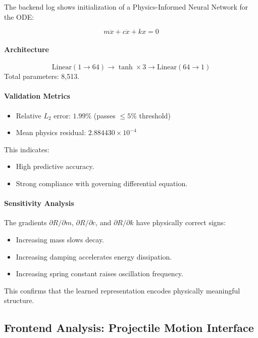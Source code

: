 \documentclass[12pt,singleside,a4paper]{article}
\begin{document}
The backend log shows initialization of a Physics-Informed Neural Network for the ODE:

\[
m\ddot{x} + c\dot{x} + kx = 0
\]

\paragraph{Architecture}
\[
\text{Linear}(1 \rightarrow 64) \rightarrow \tanh \times 3 \rightarrow \text{Linear}(64 \rightarrow 1)
\]
Total parameters: 8,513.

\paragraph{Validation Metrics}
\begin{itemize}
    \item Relative $L_2$ error: $1.99\%$ (passes $\leq 5\%$ threshold)
    \item Mean physics residual: $2.884430 \times 10^{-4}$
\end{itemize}

This indicates:
\begin{itemize}
    \item High predictive accuracy.
    \item Strong compliance with governing differential equation.
\end{itemize}

\paragraph{Sensitivity Analysis}

The gradients $\partial R/\partial m$, $\partial R/\partial c$, and $\partial R/\partial k$ have physically correct signs:

\begin{itemize}
    \item Increasing mass slows decay.
    \item Increasing damping accelerates energy dissipation.
    \item Increasing spring constant raises oscillation frequency.
\end{itemize}

This confirms that the learned representation encodes physically meaningful structure.

\subsection{Frontend Analysis: Projectile Motion Interface}
\end{document}
